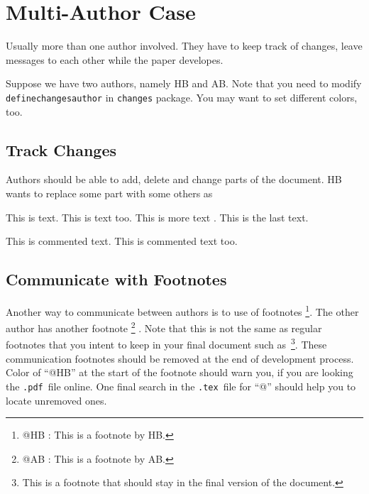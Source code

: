 \documentclass[10pt,journal,compsoc]{IEEEtran}
\makeatletter
\newcommand{\hCode}[1]{\texttt{{\footnotesize #1}}}
\newcommand{\hbFootnote}[2]{\footnote{{\color{red} @#1 : }#2}}
\theoremstyle{plain}
\theoremstyle{definition}
\theoremstyle{remark}
\newcommand{\hbDTex}{\hCode{.tex}}
\newcommand{\hbDPdf}{\hCode{.pdf}}
\makeatother
\begin{document}
{%
\section{Multi-Author Case}

Usually more than one author involved.
They have to keep track of changes, leave messages to each other
while the paper developes.

Suppose we have two authors, namely HB and AB.
Note that you need to modify 
\hCode{definechangesauthor}
in 
\hCode{changes} package.
You may want to set different colors, too.



\subsection{Track Changes}
\label{sec:trackChanges}

Authors should be able to add, delete and change parts of the document.
HB wants to replace some part with some others as

This is  text.
This is  text too.
This is more  text
.
This is the last  text.

This is commented text.
This is commented text too.


\subsection{Communicate with Footnotes}

Another way to communicate between authors is to use of footnotes
\hbFootnote{HB}{
	This is a footnote by HB.
}.
The other author has another footnote
\hbFootnote{AB}{
	This is a footnote by AB.
}
.
Note that this is not the same as regular footnotes that you intent to keep in your final document such as~\footnote{
	This is a footnote that should stay in the final version of the document.
}.
These communication footnotes should be removed at the end of development process.
Color of ``@HB'' at the start of the footnote should warn you, if you are looking the \hbDPdf\ file online.
One final search in the \hbDTex\ file for ``@'' should help you to locate unremoved ones.




}
\end{document}
